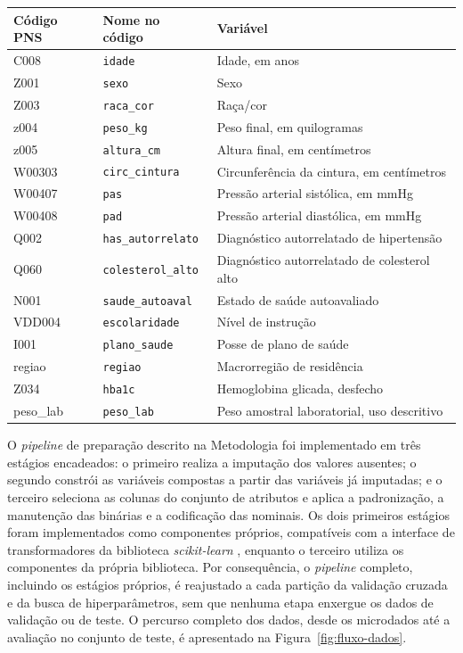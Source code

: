 \begin{quadro}[htb]
  \caption{\label{qua:dicionario}Correspondência entre os códigos da PNS 2013 e os nomes utilizados no código.}
  \small
  \begin{tabular}{|p{2.4cm}|p{4.0cm}|p{7.8cm}|}
    \hline
    \textbf{Código PNS} & \textbf{Nome no código} & \textbf{Variável} \\ \hline
    C008 & \texttt{idade} & Idade, em anos \\ \hline
    Z001 & \texttt{sexo} & Sexo \\ \hline
    Z003 & \texttt{raca\_cor} & Raça/cor \\ \hline
    z004 & \texttt{peso\_kg} & Peso final, em quilogramas \\ \hline
    z005 & \texttt{altura\_cm} & Altura final, em centímetros \\ \hline
    W00303 & \texttt{circ\_cintura} & Circunferência da cintura, em centímetros \\ \hline
    W00407 & \texttt{pas} & Pressão arterial sistólica, em mmHg \\ \hline
    W00408 & \texttt{pad} & Pressão arterial diastólica, em mmHg \\ \hline
    Q002 & \texttt{has\_autorrelato} & Diagnóstico autorrelatado de hipertensão \\ \hline
    Q060 & \texttt{colesterol\_alto} & Diagnóstico autorrelatado de colesterol alto \\ \hline
    N001 & \texttt{saude\_autoaval} & Estado de saúde autoavaliado \\ \hline
    VDD004 & \texttt{escolaridade} & Nível de instrução \\ \hline
    I001 & \texttt{plano\_saude} & Posse de plano de saúde \\ \hline
    regiao & \texttt{regiao} & Macrorregião de residência \\ \hline
    Z034 & \texttt{hba1c} & Hemoglobina glicada, desfecho \\ \hline
    peso\_lab & \texttt{peso\_lab} & Peso amostral laboratorial, uso descritivo \\ \hline
  \end{tabular}
\end{quadro}

O \textit{pipeline} de preparação descrito na Metodologia foi implementado em três estágios encadeados: o primeiro realiza a imputação dos valores ausentes; o segundo constrói as variáveis compostas a partir das variáveis já imputadas; e o terceiro seleciona as colunas do conjunto de atributos e aplica a padronização, a manutenção das binárias e a codificação das nominais. Os dois primeiros estágios foram implementados como componentes próprios, compatíveis com a interface de transformadores da biblioteca \textit{scikit-learn} \cite{pedregosa2011scikit}, enquanto o terceiro utiliza os componentes da própria biblioteca. Por consequência, o \textit{pipeline} completo, incluindo os estágios próprios, é reajustado a cada partição da validação cruzada e da busca de hiperparâmetros, sem que nenhuma etapa enxergue os dados de validação ou de teste. O percurso completo dos dados, desde os microdados até a avaliação no conjunto de teste, é apresentado na Figura~\ref{fig:fluxo-dados}.

